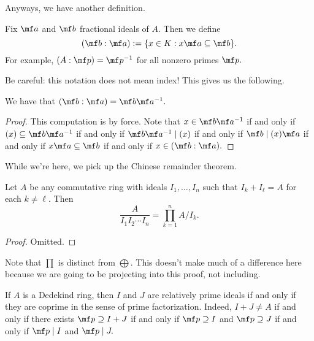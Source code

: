 Anyways, we have another definition.
\begin{defi}
    Fix $\mf a$ and $\mf b$ fractional ideals of $A.$ Then we define
    \[(\mf b:\mf a):=\{x\in K:x\mf a\subseteq\mf b\}.\]
    For example, $(A:\mf p)=\mf p^{-1}$ for all nonzero primes $\mf p.$
\end{defi}
Be careful: this notation does not mean index! This gives us the following.
\begin{lem}
    We have that $(\mf b:\mf a)=\mf b\mf a^{-1}.$
\end{lem}
\begin{proof}
    This computation is by force. Note that $x\in\mf b\mf a^{-1}$ if and only if $(x)\subseteq\mf b\mf a^{-1}$ if and only if $\mf b\mf a^{-1}\mid(x)$ if and only if $\mf b\mid(x)\mf a$ if and only if $x\mf a\subseteq\mf b$ if and only if $x\in(\mf b:\mf a).$
\end{proof}

While we're here, we pick up the Chinese remainder theorem.
\begin{thm}
    Let $A$ be any commutative ring with ideals $I_1,\ldots,I_n$ such that $I_k+I_\ell=A$ for each $k\ne\ell.$ Then
    \[\frac{A}{I_1I_2\cdots I_n}=\prod_{k=1}^nA/I_k.\]
\end{thm}
\begin{proof}
    Omitted.
\end{proof}
Note that $\prod$ is distinct from $\bigoplus.$ This doesn't make much of a difference here because we are going to be projecting into this proof, not including.
\begin{remark}
    If $A$ is a Dedekind ring, then $I$ and $J$ are relatively prime ideals if and only if they are coprime in the sense of prime factorization. Indeed, $I+J\ne A$ if and only if there exists $\mf p\supseteq I+J$ if and only if $\mf p\supseteq I$ and $\mf p\supseteq J$ if and only if $\mf p\mid I$ and $\mf p\mid J.$
\end{remark}